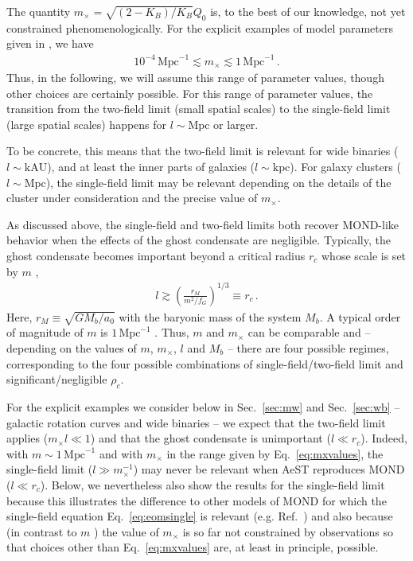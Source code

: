 \documentclass[reprint, amsmath,amssymb, nofootinbib, aps, prd]{revtex4-2}
\begin{document}
The quantity $m_\times = \sqrt{(2-K_B)/K_B} Q_0$ is, to the best of our knowledge, not yet constrained phenomenologically.
For the explicit examples of model parameters given in \cite{Skordis2020}, we have
\begin{align}
 \label{eq:mxvalues}
 10^{-4}\,\mathrm{Mpc}^{-1} \lesssim m_\times \lesssim 1\,\mathrm{Mpc}^{-1} \,.
\end{align}
Thus, in the following, we will assume this range of parameter values, though other choices are certainly possible.
For this range of parameter values, the transition from the two-field limit (small spatial scales) to the single-field limit (large spatial scales) happens for $l \sim \mathrm{Mpc}$ or larger.

To be concrete, this means that the two-field limit is relevant for wide binaries ($l \sim \mathrm{kAU}$), and at least the inner parts of galaxies ($l \sim \mathrm{kpc}$).
For galaxy clusters ($l \sim \mathrm{Mpc}$), the single-field limit may be relevant depending on the details of the cluster under consideration and the precise value of $m_\times$.

As discussed above, the single-field and two-field limits both recover MOND-like behavior when the effects of the ghost condensate are negligible.
Typically, the ghost condensate becomes important beyond a critical radius $r_c$ whose scale is set by $m$ \citep{Skordis2020,Mistele2023,Verwayen2023},
\begin{align}
 l \gtrsim \left( \frac{r_M}{m^2/f_G} \right)^{1/3} \equiv r_c \,.
\end{align}
Here, $r_M \equiv \sqrt{G M_b / a_0}$ with the baryonic mass of the system $M_b$.
A typical order of magnitude of $m$ is $1\,\mathrm{Mpc}^{-1}$ \citep{Skordis2020,Skordis2021}.
Thus, $m$ and $m_\times$ can be comparable and -- depending on the values of $m$, $m_\times$, $l$ and $M_b$ -- there are four possible regimes, corresponding to the four possible combinations of single-field/two-field limit and significant/negligible $\rho_c$.

For the explicit examples we consider below in Sec.~\ref{sec:mw} and Sec.~\ref{sec:wb} -- galactic rotation curves and wide binaries -- we expect that the two-field limit applies ($m_\times l \ll 1$) and that the ghost condensate is unimportant ($l \ll r_c$).
Indeed, with $m \sim 1\,\mathrm{Mpc}^{-1}$ and with $m_\times$ in the range given by Eq.~\eqref{eq:mxvalues}, the single-field limit ($l \gg m_\times^{-1}$) may never be relevant when AeST reproduces MOND ($l \ll r_c$).
Below, we nevertheless also show the results for the single-field limit because this illustrates the difference to other models of MOND for which the single-field equation Eq.~\eqref{eq:eomsingle} is relevant (e.g. Ref.~\cite{Bekenstein1984}) and also because (in contrast to $m$ \citep{Skordis2021,Mistele2023,Verwayen2023}) the value of $m_\times$ is so far not constrained by observations so that choices other than Eq.~\eqref{eq:mxvalues} are, at least in principle, possible.
\end{document}
